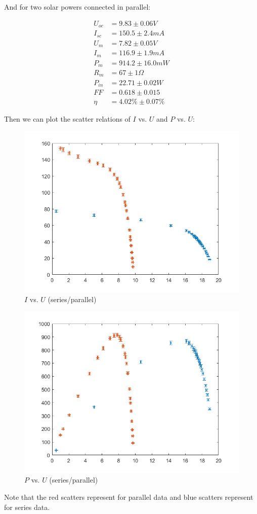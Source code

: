 \documentclass[12pt, a4paper]{article}
\begin{document}
And for two solar powers connected in parallel:

\begin{align*}
	U_{oc} &= 9.83\pm 0.06 V \\
	I_{sc} &= 150.5\pm 2.4 mA \\
	U_m &= 7.82\pm 0.05 V \\
	I_m &= 116.9\pm 1.9 mA \\
	P_m &= 914.2 \pm 16.0 mW \\
	R_m &= 67 \pm 1 \Omega \\
	P_{in} &= 22.71 \pm 0.02 W \\
	FF &= 0.618 \pm  0.015 \\
	\eta &= 4.02\% \pm 0.07 \% 
\end{align*}

Then we can plot the scatter relations of $I$ vs. $U$ and $P$ vs. $U$:
\begin{figure}[H]
	\centering
	\includegraphics[scale = 0.4]{plot1.png}
	\caption{$I$ vs. $U$ (series/parallel)}
\end{figure}

\begin{figure}[H]
	\centering
	\includegraphics[scale = 0.4]{plot2.png}
	\caption{$P$ vs. $U$ (series/parallel)}
\end{figure}
Note that the red scatters represent for parallel data and blue scatters represent for series data.
\end{document}
